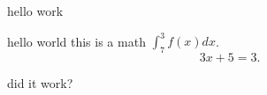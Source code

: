 \documentclass{amsart}
\begin{document}
\begin{center}
	hello work
\end{center}
	hello world this is a math $\int_7^3 f(x) dx$. 
	\[
		3x+5 = 3.
	\]



did it work?
\end{document}
